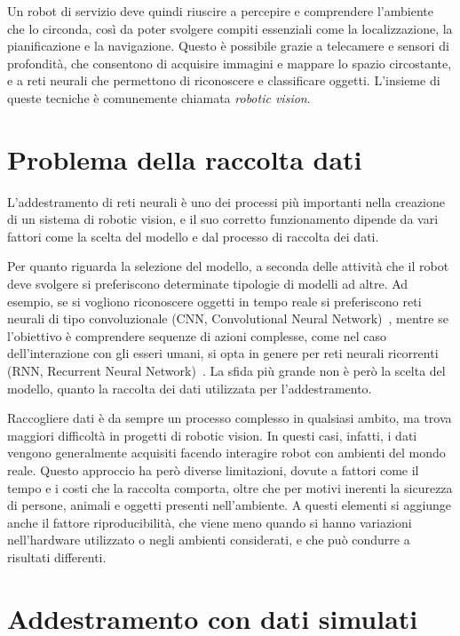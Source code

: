 \documentclass[12pt]{report}
\begin{document}
Un robot di servizio deve quindi riuscire a percepire e comprendere l'ambiente che lo circonda, così da poter svolgere compiti essenziali come la localizzazione, la pianificazione e la navigazione. Questo è possibile grazie a telecamere e sensori di profondità, che consentono di acquisire immagini e mappare lo spazio circostante, e a reti neurali che permettono di riconoscere e classificare oggetti. L'insieme di queste tecniche è comunemente chiamata \textit{robotic vision}.

\section{Problema della raccolta dati}
\label{sec:raccolta_dati}

L'addestramento di reti neurali è uno dei processi più importanti nella creazione di un sistema di robotic vision, e il suo corretto funzionamento dipende da vari fattori come la scelta del modello e dal processo di raccolta dei dati.

Per quanto riguarda la selezione del modello, a seconda delle attività che il robot deve svolgere si preferiscono determinate tipologie di modelli ad altre. Ad esempio, se si vogliono riconoscere oggetti in tempo reale si preferiscono reti neurali di tipo convoluzionale (CNN, Convolutional Neural Network)~\cite{oshea2015introductionconvolutionalneuralnetworks}, mentre se l'obiettivo è comprendere sequenze di azioni complesse, come nel caso dell'interazione con gli esseri umani, si opta in genere per reti neurali ricorrenti (RNN, Recurrent Neural Network)~\cite{ZHANG20209}. La sfida più grande non è però la scelta del modello, quanto la raccolta dei dati utilizzata per l'addestramento.

Raccogliere dati è da sempre un processo complesso in qualsiasi ambito, ma trova maggiori difficoltà in progetti di robotic vision. In questi casi, infatti, i dati vengono generalmente acquisiti facendo interagire robot con ambienti del mondo reale. Questo approccio ha però diverse limitazioni, dovute a fattori come il tempo e i costi che la raccolta comporta, oltre che per motivi inerenti la sicurezza di persone, animali e oggetti presenti nell'ambiente. A questi elementi si aggiunge anche il fattore riproducibilità, che viene meno quando si hanno variazioni nell'hardware utilizzato o negli ambienti considerati, e che può condurre a risultati differenti.

\section{Addestramento con dati simulati}
\label{sec:addestramento_dati_simulati}
\end{document}
